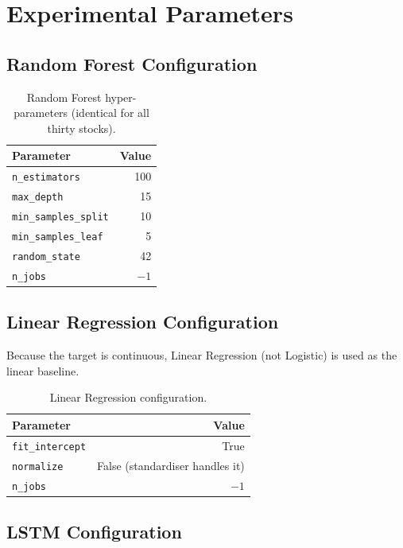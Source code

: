 \documentclass[12pt,a4paper,oneside]{report}
\newcommand{\code}[1]{\texttt{#1}}
\begin{document}
\section{Experimental Parameters}

\subsection{Random Forest Configuration}

\begin{table}[H]
  \centering
  \caption{Random Forest hyper-parameters (identical for all
  thirty stocks).}
  \label{tab:rf}
  \begin{tabular}{lr}
    \toprule
    Parameter & Value \\
    \midrule
    \code{n\_estimators}        & 100 \\
    \code{max\_depth}           & 15 \\
    \code{min\_samples\_split}  & 10 \\
    \code{min\_samples\_leaf}   & 5 \\
    \code{random\_state}        & 42 \\
    \code{n\_jobs}              & $-1$ \\
    \bottomrule
  \end{tabular}
\end{table}

\subsection{Linear Regression Configuration}

Because the target is continuous, Linear Regression (not Logistic)
is used as the linear baseline.

\begin{table}[H]
  \centering
  \caption{Linear Regression configuration.}
  \label{tab:lr}
  \begin{tabular}{lr}
    \toprule
    Parameter & Value \\
    \midrule
    \code{fit\_intercept} & True \\
    \code{normalize}     & False (standardiser handles it) \\
    \code{n\_jobs}       & $-1$ \\
    \bottomrule
  \end{tabular}
\end{table}

\subsection{\ac{LSTM} Configuration}
\end{document}

